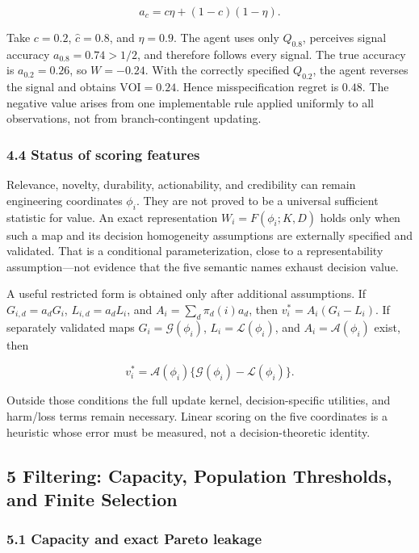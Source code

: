 \documentclass[
  11pt]{article}
\begin{document}
\[a_c=c\eta+(1-c)(1-\eta).\]

Take \(c=0.2\), \(\hat c=0.8\), and \(\eta=0.9\). The agent uses only
\(Q_{0.8}\), perceives signal accuracy \(a_{0.8}=0.74>1/2\), and
therefore follows every signal. The true accuracy is \(a_{0.2}=0.26\),
so \(W=-0.24\). With the correctly specified \(Q_{0.2}\), the agent
reverses the signal and obtains \(\mathrm{VOI}=0.24\). Hence
misspecification regret is \(0.48\). The negative value arises from one
implementable rule applied uniformly to all observations, not from
branch-contingent updating.

\subsubsection{4.4 Status of scoring
features}\label{status-of-scoring-features}

Relevance, novelty, durability, actionability, and credibility can
remain engineering coordinates \(\phi_i\). They are not proved to be a
universal sufficient statistic for value. An exact representation
\(W_i=F(\phi_i;K,D)\) holds only when such a map and its decision
homogeneity assumptions are externally specified and validated. That is
a conditional parameterization, close to a representability
assumption---not evidence that the five semantic names exhaust decision
value.

A useful restricted form is obtained only after additional assumptions.
If \(G_{i,d}=a_dG_i\), \(L_{i,d}=a_dL_i\), and
\(A_i=\sum_d\pi_d(i)a_d\), then \(v_i^*=A_i(G_i-L_i)\). If separately
validated maps \(G_i=\mathcal G(\phi_i)\), \(L_i=\mathcal L(\phi_i)\),
and \(A_i=\mathcal A(\phi_i)\) exist, then

\[v_i^*=\mathcal A(\phi_i)\{\mathcal G(\phi_i)-\mathcal L(\phi_i)\}.\]

Outside those conditions the full update kernel, decision-specific
utilities, and harm/loss terms remain necessary. Linear scoring on the
five coordinates is a heuristic whose error must be measured, not a
decision-theoretic identity.

\subsection{5 Filtering: Capacity, Population Thresholds, and Finite
Selection}\label{filtering-capacity-population-thresholds-and-finite-selection}

\subsubsection{5.1 Capacity and exact Pareto
leakage}\label{capacity-and-exact-pareto-leakage}
\end{document}
